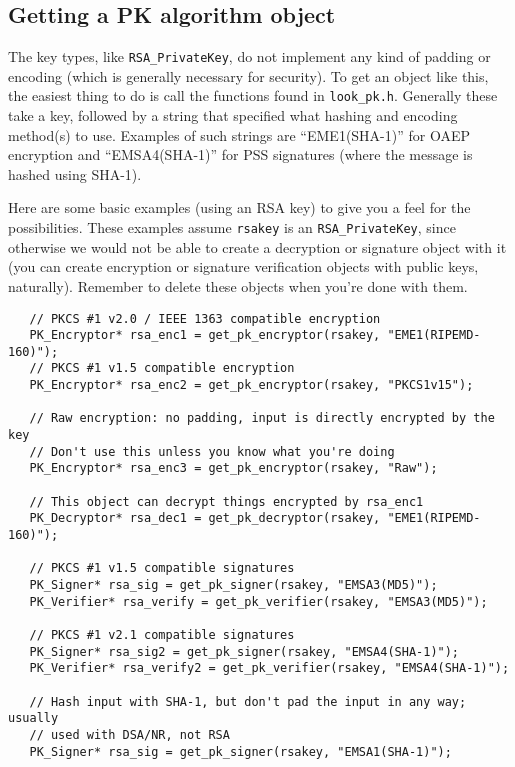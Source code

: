 \documentclass{article}
\newcommand{\filename}[1]{\texttt{#1}}
\newcommand{\type}[1]{\texttt{#1}}
\begin{document}
\subsection{Getting a PK algorithm object}

The key types, like \type{RSA\_PrivateKey}, do not implement any kind of
padding or encoding (which is generally necessary for security). To get an
object like this, the easiest thing to do is call the functions found in
\filename{look\_pk.h}. Generally these take a key, followed by a string that
specified what hashing and encoding method(s) to use. Examples of such strings
are ``EME1(SHA-1)'' for OAEP encryption and ``EMSA4(SHA-1)'' for PSS signatures
(where the message is hashed using SHA-1).

Here are some basic examples (using an RSA key) to give you a feel for the
possibilities. These examples assume \type{rsakey} is an
\type{RSA\_PrivateKey}, since otherwise we would not be able to create a
decryption or signature object with it (you can create encryption or signature
verification objects with public keys, naturally). Remember to delete these
objects when you're done with them.

\begin{verbatim}
   // PKCS #1 v2.0 / IEEE 1363 compatible encryption
   PK_Encryptor* rsa_enc1 = get_pk_encryptor(rsakey, "EME1(RIPEMD-160)");
   // PKCS #1 v1.5 compatible encryption
   PK_Encryptor* rsa_enc2 = get_pk_encryptor(rsakey, "PKCS1v15");

   // Raw encryption: no padding, input is directly encrypted by the key
   // Don't use this unless you know what you're doing
   PK_Encryptor* rsa_enc3 = get_pk_encryptor(rsakey, "Raw");

   // This object can decrypt things encrypted by rsa_enc1
   PK_Decryptor* rsa_dec1 = get_pk_decryptor(rsakey, "EME1(RIPEMD-160)");

   // PKCS #1 v1.5 compatible signatures
   PK_Signer* rsa_sig = get_pk_signer(rsakey, "EMSA3(MD5)");
   PK_Verifier* rsa_verify = get_pk_verifier(rsakey, "EMSA3(MD5)");

   // PKCS #1 v2.1 compatible signatures
   PK_Signer* rsa_sig2 = get_pk_signer(rsakey, "EMSA4(SHA-1)");
   PK_Verifier* rsa_verify2 = get_pk_verifier(rsakey, "EMSA4(SHA-1)");

   // Hash input with SHA-1, but don't pad the input in any way; usually
   // used with DSA/NR, not RSA
   PK_Signer* rsa_sig = get_pk_signer(rsakey, "EMSA1(SHA-1)");
\end{verbatim}
\end{document}
